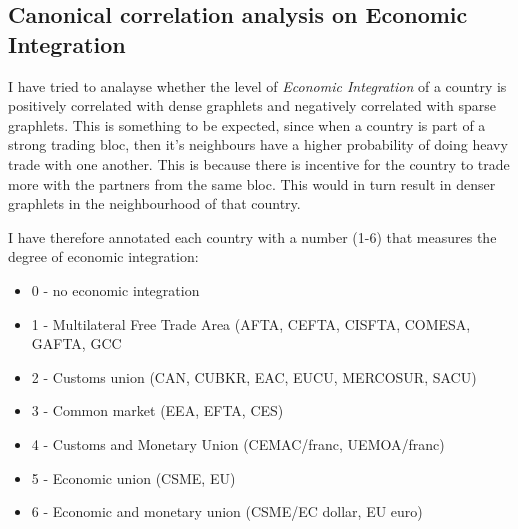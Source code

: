 \documentclass[11pt,a4paper,oneside]{report}
\begin{document}
\subsection*{Canonical correlation analysis on Economic Integration}

I have tried to analayse whether the level of \emph{Economic Integration} of a country is positively correlated with dense graphlets and negatively correlated with sparse graphlets. This is something to be expected, since when a country is part of a strong trading bloc, then it's neighbours have a higher probability of doing heavy trade with one another. This is because there is incentive for the country to trade more with the partners from the same bloc. This would in turn result in denser graphlets in the neighbourhood of that country. 

I have therefore annotated each country with a number (1-6) that measures the degree of economic integration:
\begin{itemize}
 \item 0 - no economic integration 
 \item 1 - Multilateral Free Trade Area (AFTA, CEFTA, CISFTA, COMESA, GAFTA, GCC
 \item 2 - Customs union (CAN, CUBKR, EAC, EUCU, MERCOSUR, SACU)
 \item 3 - Common market (EEA, EFTA, CES) 
 \item 4 - Customs and Monetary Union (CEMAC/franc, UEMOA/franc) 
 \item 5 - Economic union (CSME, EU) 
 \item 6 - Economic and monetary union (CSME/EC dollar, EU euro)
\end{itemize}
\end{document}
